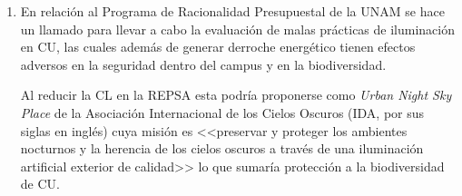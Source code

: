 \begin{enumerate}[I]
\item En relación al Programa de Racionalidad Presupuestal de la UNAM se hace un llamado para llevar a cabo la evaluación de malas prácticas de iluminación en CU, las cuales además de generar derroche energético tienen efectos adversos en la seguridad dentro del campus y en la biodiversidad.

Al reducir la CL en la REPSA esta podría proponerse como \textit{Urban Night Sky Place} de la Asociación Internacional de los Cielos Oscuros (IDA, por sus siglas en inglés) cuya misión es <<preservar y proteger los ambientes nocturnos y la herencia de los cielos oscuros a través de una iluminación artificial exterior de calidad>> lo que sumaría protección a la biodiversidad de CU. 

\end{enumerate}